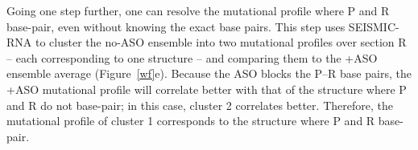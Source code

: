 \documentclass[main.tex]{subfiles}
\begin{document}
Going one step further, one can resolve the mutational profile where P and R base-pair, even without knowing the exact base pairs.
This step uses SEISMIC-RNA to cluster the no-ASO ensemble into two mutational profiles over section R -- each corresponding to one structure -- and comparing them to the +ASO ensemble average (Figure~\ref{wf}e).
Because the ASO blocks the P--R base pairs, the +ASO mutational profile will correlate better with that of the structure where P and R do not base-pair; in this case, cluster 2 correlates better.
Therefore, the mutational profile of cluster 1 corresponds to the structure where P and R base-pair.

%
%
%
\end{document}
